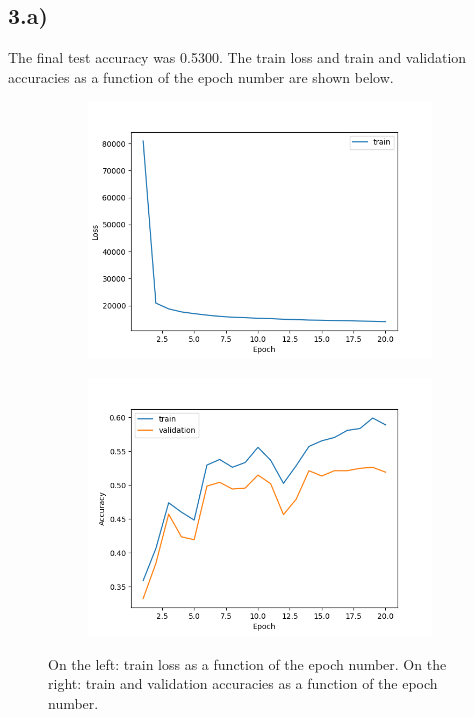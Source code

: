 \documentclass[a4paper, 12pt]{article}
\begin{document}
\subsection*{3.a)} The final test accuracy was 0.5300. The train loss and train and validation accuracies as a function of the epoch number are shown below. 
\vspace{-0.4 cm}
\begin{figure}[H]
    \centering
     \begin{subfigure}{0.47\textwidth}
        \includegraphics[width=\textwidth]{plot/1-3_losses.png}
        \label{fig:3_ii}
    \end{subfigure}
    \hfill
    \begin{subfigure}{0.43
    \textwidth}        \includegraphics[width=\textwidth]{plot/1-3_accuracies.png}
        \label{fig:3_ieg}
    \end{subfigure}
    \vspace{-0.6cm}
    \caption{On the left: train loss as a function of the epoch number. On the right: train and validation accuracies as a function of the epoch number.}
    \label{fig:q3}
\end{figure}
\end{document}
